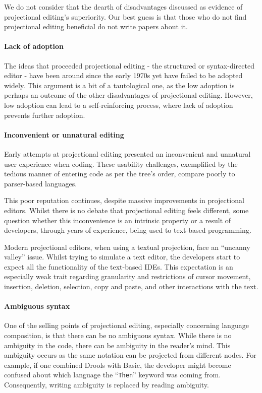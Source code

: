 We do not consider that the dearth of disadvantages discussed as evidence of projectional editing's superiority.
Our best guess is that those who do not find projectional editing beneficial do not write papers about it.

\paragraph{Lack of adoption} The ideas that proceeded projectional editing - the structured or syntax-directed editor - have been around since the early 1970s yet have failed to be adopted widely.
This argument is a bit of a tautological one, as the low adoption is perhaps an outcome of the other disadvantages of projectional editing.
However, low adoption can lead to a self-reinforcing process, where lack of adoption prevents further adoption.

\paragraph{Inconvenient or unnatural editing} Early attempts at projectional editing presented an inconvenient and unnatural user experience when coding.
These usability challenges, exemplified by the tedious manner of entering code as per the tree's order, compare poorly to parser-based languages.

This poor reputation continues, despite massive improvements in projectional editors.
Whilst there is no debate that projectional editing feels different, some question whether this inconvenience is an intrinsic property or a result of developers, through years of experience, being used to text-based programming.

Modern projectional editors, when using a textual projection, face an ``uncanny valley'' issue.
Whilst trying to simulate a text editor, the developers start to expect all the functionality of the text-based IDEs.
This expectation is an especially weak trait regarding granularity and restrictions of cursor movement, insertion, deletion, selection, copy and paste, and other interactions with the text.

\paragraph{Ambiguous syntax} One of the selling points of projectional editing, especially concerning language composition, is that there can be no ambiguous syntax.
While there is no ambiguity in the code, there can be ambiguity in the reader's mind.
This ambiguity occurs as the same notation can be projected from different nodes.
For example, if one combined Drools with Basic, the developer might become confused about which language the ``\texttt{Then}'' keyword was coming from.
Consequently, writing ambiguity is replaced by reading ambiguity.


